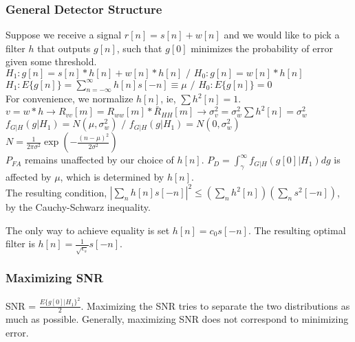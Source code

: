 \documentclass[8pt]{extarticle}
\begin{document}
\begin{multicols*}{3}
\begin{center}
\subsubsection{General Detector Structure}
Suppose we receive a signal \( r[n] = s[n] + w[n] \) and we would like to pick a filter \( h \) that outputs \( g[n] \), such that \( g[0] \) minimizes the probability of error given some threshold. \\

\( H_1: g[n] = s[n] * h[n] + w[n] * h[n]\text{ / }H_0: g[n] = w[n] * h[n] \) \\

\( H_1: E\{g[n]\} = \sum_{n=-\infty}^{\infty} h[n] s[-n] \equiv \mu\text{ / } H_0: E\{g[n]\} = 0 \) \\

For convenience, we normalize \( h[n] \), ie, \( \sum h^2[n] = 1 \). \\

\( v = w * h \rightarrow R_{vv}[m] = R_{ww}[m] * \bar{R}_{HH}[m] \rightarrow \sigma_v^2 = \sigma_w^2 \sum h^2[n] =  \sigma_w^2 \) \\

\( f_{G|H}(g|H_1) = N(\mu, \sigma_w^2)\text{ / } f_{G|H}(g|H_1) = N(0, \sigma_w^2) \) \\

\( N = \frac{1}{2\pi\sigma^2}\exp{\left(-\frac{(n-\mu)^2}{2\sigma^2}\right)} \) \\

\( P_{FA} \) remains unaffected by our choice of \( h[n] \). \( P_D = \int_{\gamma}^{\infty} f_{G|H}(g[0]|H_1) dg \) is affected by \( \mu \), which is determined by \( h[n] \). \\

The resulting condition, \( |\sum_{n} h[n]s[-n]|^2 \leq (\sum_{n} h^2[n])(\sum_{n} s^2[-n]) \), by the Cauchy-Schwarz inequality.

The only way to achieve equality is set \( h[n] = c_0 s[-n] \). The resulting optimal filter is \( h[n] = \frac{1}{\sqrt{\epsilon_s}} s[-n] \).

\subsubsection{Maximizing SNR}
SNR = \( \frac{E\{g[0]|H_1\}^2}{2} \). Maximizing the SNR tries to separate the two distributions as much as possible. Generally, maximizing SNR does not correspond to minimizing error.


\end{center}
\end{multicols*}
\end{document}
